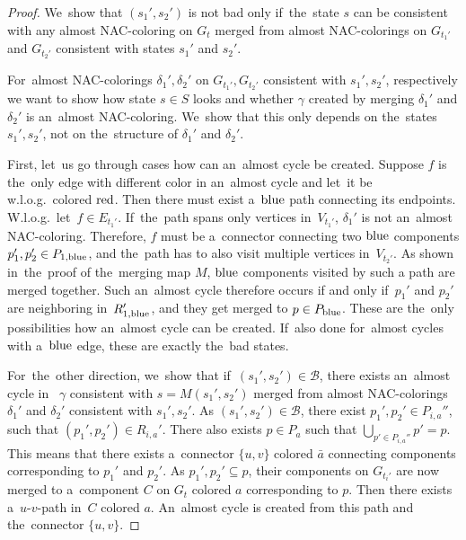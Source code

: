 \begin{proof}
	We~show that \( (s_1', s_2') \) is not bad only if~the~state \( s \)
	can be consistent with any almost NAC-coloring on \( G_t \)
	merged from almost NAC-colorings on \( G_{t_1'} \) and \( G_{t_2'} \)
	consistent with states \( s_1' \) and \( s_2' \).

	For~almost NAC-colorings \( \delta_1', \delta_2' \) on \( G_{t_1'}, G_{t_2'} \)
	consistent with \( s_1', s_2' \),
	respectively we want to show how state \( s \in S \) looks and
	whether \rbcol{} \( \gamma \) created by merging \( \delta_1' \) and \( \delta_2' \)
	is an~almost NAC-coloring.
	We~show that this only depends on the~states \( s_1', s_2' \),
	not on the~structure of \( \delta_1' \) and \( \delta_2' \).

	First, let~us go through cases how can an~almost cycle be created.
	Suppose \( f \) is the~only edge with different color
	in an~almost cycle and let~it be w.l.o.g.\ colored \( \text{red} \).
	Then there must exist a~\( \text{blue} \) path connecting its endpoints.
	W.l.o.g.\ let~\( f \in E_{t_1'} \).
	If~the~path spans only vertices
	in~\( V_{t_1'} \), \( \delta_1' \) is not an~almost NAC-coloring.
	Therefore, \( f \) must be
	a~connector connecting two \( \text{blue} \) components \( p_1', p_2' \in P_{1,\text{blue}} \),
	and the~path has to also visit multiple vertices in~\( V_{t_2'} \).
	As shown in~the~proof of the~merging map \( M \), \( \text{blue} \) components
	visited by such a path are merged together.
	Such an~almost cycle therefore occurs
	if and only if~\( p_1' \) and \( p_2' \) are neighboring in~\( R_{1,\text{blue}}' \),
	and they get merged to \( p \in P_{\text{blue}} \).
	These are the~only possibilities how an~almost cycle can be created.
	If~also done for~almost cycles with a~\( \text{blue} \) edge,
	these are exactly the~bad states.

	For~the~other direction, we~show that if~\( (s_1', s_2') \in \mathcal{B} \),
	there exists an~almost cycle
	in~\rbcol{} \( \gamma \) consistent with \( s = M(s_1', s_2') \)
	merged from almost NAC-colorings \( \delta_1' \) and \( \delta_2' \)
	consistent with \( s_1', s_2' \).
	As \( (s_1', s_2') \in \mathcal{B} \),
	there exist \( p_1', p_2' \in P_{i, a}'' \),
	such that \( (p_1', p_2') \in R_{i, a}' \).
	There also exists \( p \in P_{a} \) such that \( \bigcup_{p' \in P_{i, a}''} p' = p \).
	This means that there exists a~connector \( \{u, v\} \) colored \( \bar{a} \) connecting
	components corresponding to \( p_1' \) and \( p_2' \).
	As \( p_1', p_2' \subseteq p \),
	their components on \( G_{t_i'} \) are now merged
	to a~component \( C \) on \( G_t \) colored \( a \) corresponding to \( p \).
	Then there exists a~\( u \)-\( v \)-path in~\( C \) colored \( a \).
	An~almost cycle is created from this path and the~connector \( \{u, v\} \).
\end{proof}
%

